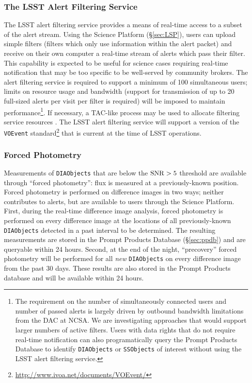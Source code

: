 \subsubsection{The LSST Alert Filtering Service}\label{sec:filtering_service}

The LSST alert filtering service provides a means of real-time access to a subset of the alert stream.
Using the Science Platform (\S \ref{sec:LSP}),
users can upload simple filters (filters which only use information within the alert packet) and receive on their own computer a real-time stream of alerts which pass their filter.
This capability is expected to be useful for science cases requiring real-time notification that may be too specific to be well-served by community brokers.
The alert filtering service is required to support a minimum of 100 simultaneous users; limits on resource usage and bandwidth (support for transmission of up to 20 full-sized alerts per visit per filter is required) will be imposed to maintain performance\footnote{
The requirement on the number of simultaneously connected users and number of passed alerts is largely driven by outbound bandwidth limitations from the DAC at NCSA.
We are investigating approaches that would support larger numbers of active filters.
Users with data rights that do not require real-time notification can also programatically query the Prompt Products Database to identify \texttt{DIAObjects} or \texttt{SSObjects} of interest without using the LSST alert filtering service.}.
If necessary, a TAC-like process may be used to allocate filtering service resources .
The LSST alert filtering service will support a version of the \texttt{VOEvent} standard\footnote{\url{http://www.ivoa.net/documents/VOEvent/}} that is current at the time of LSST operations.

\subsubsection{Forced Photometry}\label{sec:AGP_force}

Measurements of \texttt{DIAObjects} that are below the ${\rm SNR} > 5$ threshold are available through ``forced photometry'': flux is measured at a previously-known position.
Forced photometry is performed on difference images in two ways; neither contributes to alerts, but are available to users through the Science Platform.
First, during the real-time difference image analysis, forced photometry is performed on every difference image at the locations of all previously-known {\tt DIAObjects} detected in a past interval to be determined.
The resulting measurements are stored in the Prompt Products Database (\S \ref{sec:ppdb}) and are queryable within 24 hours.
Second, at the end of the night, ``precovery'' forced photometry will be performed for all \textit{new} \texttt{DIAObjects} on every difference image from the past 30 days.
These results are also stored in the Prompt Products database and will be available within 24 hours.

